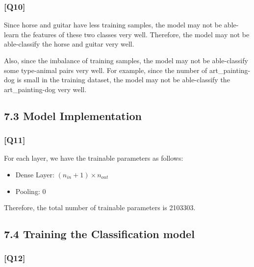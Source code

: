 \documentclass{article}
\begin{document}
\subsubsection*{[Q10]}
Since horse and guitar have less training samples, the model may not be able-learn the features of these two classes very well.
Therefore, the model may not be able-classify the horse and guitar very well.

Also, since the imbalance of training samples, the model may not be able-classify some type-animal pairs very well. For example, since the number of art\_painting-dog is small in the training dataset, the model may not be able-classify the art\_painting-dog very well.


\subsection*{7.3 Model Implementation}

\subsubsection*{[Q11]}

For each layer, we have the trainable parameters as follows:
\begin{itemize}
    \item Dense Layer: $(n_{in} + 1) \times n_{out}$
    \item Pooling: 0
\end{itemize}

Therefore, the total number of trainable parameters is 2103303.


\subsection*{7.4 Training the Classification model}

\subsubsection*{[Q12]}
\end{document}
